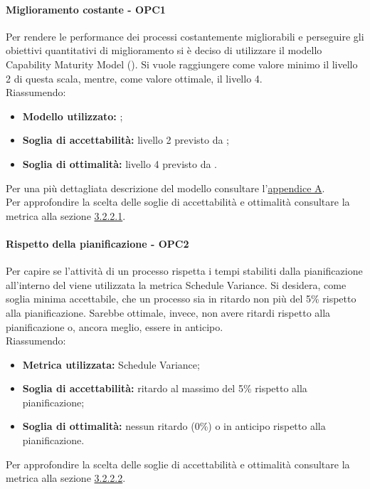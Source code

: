 \documentclass[PianoDiQualifica.tex]{subfiles}
\begin{document}
			\paragraph{Miglioramento costante - OPC1}
			Per rendere le performance dei processi costantemente migliorabili e perseguire gli obiettivi quantitativi di miglioramento si è deciso di utilizzare il modello Capability Maturity Model ().
			Si vuole raggiungere come valore minimo il livello 2 di questa scala, mentre, come valore ottimale, il livello 4. \\
			Riassumendo:
			\begin{itemize}
			\item \textbf{Modello utilizzato:} ;
			\item \textbf{Soglia di accettabilità:} livello 2 previsto da ;
			\item \textbf{Soglia di ottimalità:} livello 4 previsto da .
			\end{itemize}
			Per una più dettagliata descrizione del modello  consultare l'\hyperlink{CMM_label}{appendice A}. \\
			Per approfondire la scelta delle soglie di accettabilità e ottimalità consultare la metrica alla sezione \hyperlink{CMM_m}{3.2.2.1}.

			\paragraph{Rispetto della pianificazione - OPC2}
			Per capire se l'attività di un processo rispetta i tempi stabiliti dalla pianificazione all'interno del \PPdocRR{} viene utilizzata la metrica Schedule Variance.
			Si desidera, come soglia minima accettabile, che un processo sia in ritardo non più del 5\% rispetto alla pianificazione. Sarebbe ottimale, invece, non avere ritardi
			rispetto alla pianificazione o, ancora meglio, essere in anticipo.\\
			Riassumendo:
			\begin{itemize}
			\item \textbf{Metrica utilizzata:} Schedule Variance;
			\item \textbf{Soglia di accettabilità:} ritardo al massimo del 5\% rispetto alla pianificazione;
			\item \textbf{Soglia di ottimalità:} nessun ritardo (0\%) o in anticipo rispetto alla pianificazione.
			\end{itemize}
			Per approfondire la scelta delle soglie di accettabilità e ottimalità consultare la metrica alla sezione \hyperlink{Schedule_m}{3.2.2.2}.
\end{document}
